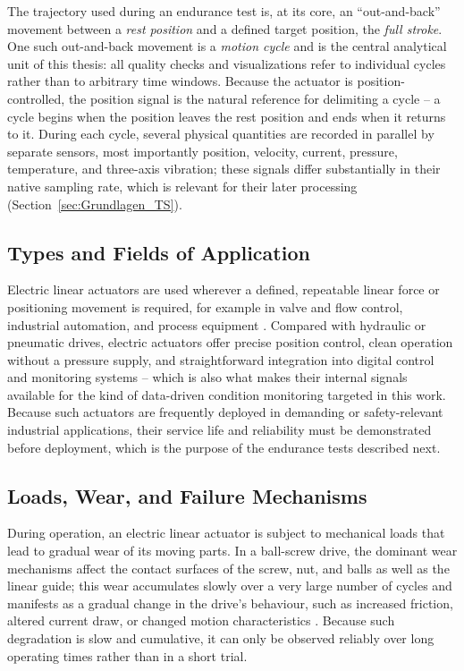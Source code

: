 The trajectory used during an endurance test is, at its core, an ``out-and-back''
movement between a \emph{rest position} and a defined target position, the \emph{full
stroke}. One such out-and-back movement is a \emph{motion cycle} and is the central
analytical unit of this thesis: all quality checks and visualizations refer to individual
cycles rather than to arbitrary time windows. Because the actuator is position-controlled,
the position signal is the natural reference for delimiting a cycle -- a cycle begins when
the position leaves the rest position and ends when it returns to it. During each cycle,
several physical quantities are recorded in parallel by separate sensors, most importantly
position, velocity, current, pressure, temperature, and three-axis vibration; these
signals differ substantially in their native sampling rate, which is relevant for their
later processing (Section~\ref{sec:Grundlagen_TS}).

\subsection{Types and Fields of Application}
\label{subsec:Grundlagen_Typen}

Electric linear actuators are used wherever a defined, repeatable linear force or
positioning movement is required, for example in valve and flow control, industrial
automation, and process equipment \parencite{TODO-actuator-fundamentals}. Compared with
hydraulic or pneumatic drives, electric actuators offer precise position control, clean
operation without a pressure supply, and straightforward integration into digital control
and monitoring systems -- which is also what makes their internal signals available for
the kind of data-driven condition monitoring targeted in this work. Because such actuators
are frequently deployed in demanding or safety-relevant industrial applications, their
service life and reliability must be demonstrated before deployment, which is the purpose
of the endurance tests described next.

\subsection{Loads, Wear, and Failure Mechanisms}
\label{subsec:Grundlagen_Verschleiss}

During operation, an electric linear actuator is subject to mechanical loads that lead to
gradual wear of its moving parts. In a ball-screw drive, the dominant wear mechanisms
affect the contact surfaces of the screw, nut, and balls as well as the linear guide;
this wear accumulates slowly over a very large number of cycles and manifests as a gradual
change in the drive's behaviour, such as increased friction, altered current draw, or
changed motion characteristics \parencite{ma_wear_2024}. Because such degradation is slow
and cumulative, it can only be observed reliably over long operating times rather than in
a short trial.

